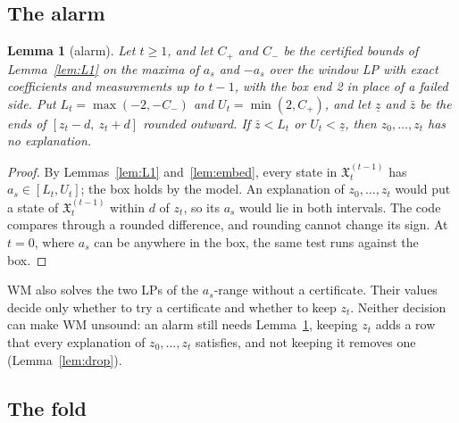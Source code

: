 \documentclass[11pt,a4paper]{article}
\newtheorem{alemma}{Lemma}[section]
\begin{document}
\subsection{The alarm}

\begin{alemma}[alarm]\label{lem:alarm}
Let $t\ge1$, and let $C_+$ and $C_-$ be the certified bounds of Lemma~\ref{lem:L1} on the maxima of $a_s$ and $-a_s$
over the window LP with exact coefficients and measurements up to $t-1$, with the box end 2 in place of a failed side.
Put $L_t = \max(-2, -C_-)$ and $U_t = \min(2, C_+)$, and let $\underline z$ and $\bar z$ be the ends of
$[z_t - d,\ z_t + d]$ rounded outward. If $\bar z < L_t$ or $U_t < \underline z$, then $z_0,\dots,z_t$ has no
explanation.
\end{alemma}
\begin{proof}
By Lemmas~\ref{lem:L1} and~\ref{lem:embed}, every state in $\mathfrak{X}^{(t-1)}_t$ has $a_s\in[L_t, U_t]$; the box
holds by the model. An explanation of $z_0,\dots,z_t$ would put a state of $\mathfrak{X}^{(t-1)}_t$ within $d$ of
$z_t$, so its $a_s$ would lie in both intervals. The code compares through a rounded difference, and rounding cannot
change its sign. At $t = 0$, where $a_s$ can be anywhere in the box, the same test runs against the box.
\end{proof}

WM also solves the two LPs of the $a_s$-range without a certificate. Their values decide only whether to try a
certificate and whether to keep $z_t$. Neither decision can make WM unsound: an alarm still needs
Lemma~\ref{lem:alarm}, keeping $z_t$ adds a row that every explanation of $z_0,\dots,z_t$ satisfies, and not keeping it
removes one (Lemma~\ref{lem:drop}).

\subsection{The fold}
\end{document}
